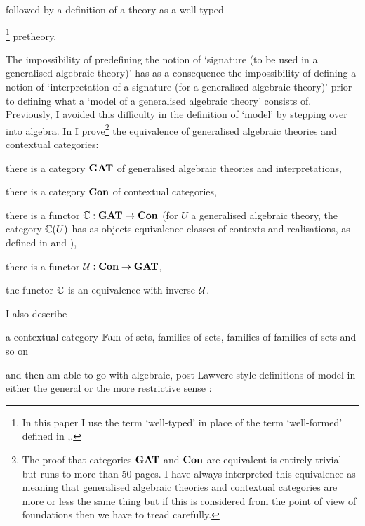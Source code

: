 followed by a definition of a theory as a well-typed{\footnote{In this paper I use the term `well-typed' in place of the term `well-formed' defined in \cite{Cartmell78},\cite{Cartmell86}.} pretheory. 

\note The impossibility of predefining the notion of `signature (to be used in a generalised algebraic theory)' has as a consequence
the impossibility of defining a notion of `interpretation of a signature (for a generalised algebraic theory)' prior to 
defining what a `model of a generalised algebraic theory' consists of.  Previously, I avoided this difficulty
in the definition of `model' by stepping over into algebra.
In \cite{Cartmell78} I prove\footnote{
The proof that categories $\catGAT$ and $\catCon$ are equivalent  is entirely trivial but runs to more than 50 pages. I have always interpreted this equivalence as meaning that generalised algebraic theories and contextual categories are more or less the same thing but if this is considered from the point of view of foundations then we have to tread carefully.} the equivalence of generalised algebraic theories and contextual categories: 
\noindent \label{ccgatequivalence}
\begin{point}
there is a category $\catGAT$ of generalised algebraic theories and interpretations,
\end{point}
\begin{point}
there is a category $\catCon$ of contextual categories,
\end{point}
\begin{point}
there is a functor $\ccat[C]: \catGAT \morph \catCon$  (for $U$ a generalised algebraic theory, the category $\ccat[C](U)$ 
has as objects equivalence classes of contexts and realisations, as defined 
in \cite{Cartmell78} and  \cite{Cartmell86}), 
\end{point}
\begin{point}
there is a functor $\gat[U]:\catCon \morph \catGAT$,
\end{point}
\begin{point}
the functor $\ccat[C]$ is an equivalence with inverse $\gat[U]$.
\end{point}
I also describe 
\begin{point}
a contextual category $\Fam$ of sets, families of sets, families of families of sets and so on 
\end{point}
and then am able to go with  algebraic, post-Lawvere
style  definitions of model in either the general or the more restrictive sense : \\
}
